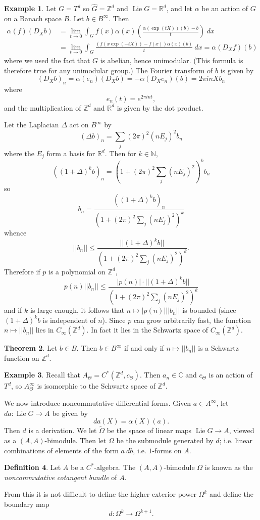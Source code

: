 \documentclass[12pt]{report}
\newcommand{\NN}{\mathbb{N}}
\newcommand{\ZZ}{\mathbb{Z}}
\newcommand{\RR}{\mathbb{R}}
\newcommand{\CC}{\mathbb{C}}
\newcommand{\Lie}{\operatorname{Lie}}
\newcommand{\dfn}[1]{\emph{#1}\index{#1}}
\theoremstyle{definition}
\newtheorem{theorem}{Theorem}[chapter]
\newtheorem{definition}[theorem]{Definition}
\newtheorem{example}[theorem]{Example}
\begin{document}
\begin{example}
    Let $G = T^d$ so $\hat G = \ZZ^d$ and $\Lie G = \RR^d$, and let $\alpha$ be an action of $G$ on a Banach space $B$. Let $b \in B^\infty$. Then
\begin{align*}
    \alpha(f)(D_Xb) &= \lim_{t \to 0} \int_G f(x) \alpha(x)\left(\frac{\alpha(\exp(tX))(b) - b}{t}\right) ~dx\\
        &= \lim_{t \to 0} \int_G \frac{(f(x \exp(-tX)) - f(x))\alpha(x)(b)}{t} ~dx = \alpha(D_Xf)(b)
\end{align*}
    where we used the fact that $G$ is abelian, hence unimodular. (This formula is therefore true for any unimodular group.) The Fourier transform of $b$ is given by
    $$(D_Xb)_n = \alpha(e_n)(D_Xb) = -\alpha(D_Xe_n)(b) = 2\pi inXb_n$$
    where
    $$e_n(t) = e^{2\pi int},$$
    and the multiplication of $\ZZ^d$ and $\RR^d$ is given by the dot product.

    Let the Laplacian $\Delta$ act on $B^\infty$ by
    $$(\Delta b)_n = \sum_j (2\pi)^2 (nE_j)^2 b_n$$
    where the $E_j$ form a basis for $\RR^d$. Then for $k \in \NN$,
    $$((1 + \Delta)^k b)_n = \left(1 + (2\pi)^2 \sum_j (nE_j)^2\right)^k b_n$$
    so
    $$b_n = \frac{((1 + \Delta)^kb)_n}{(1 + (2\pi)^2\sum_j(nE_j)^2)^k}$$
    whence
    $$||b_n|| \leq \frac{||(1+ \Delta)^kb||}{(1 + (2\pi)^2\sum_j (nE_j)^2)^k}.$$
    Therefore if $p$ is a polynomial on $\ZZ^d$,
    $$p(n)||b_n|| \leq \frac{|p(n)|\cdot ||(1 + \Delta)^kb||}{(1 + (2\pi)^2 \sum_j (nE_j)^2)^k}$$
    and if $k$ is large enough, it follows that $n \mapsto |p(n)|||b_n||$ is bounded (since $(1 + \Delta)^kb$ is independent of $n$). Since $p$ can grow arbitrarily fast, the function $n \mapsto ||b_n||$ lies in $C_\infty(\ZZ^d)$. In fact it lies in the Schwartz space of $C_\infty(\ZZ^d)$.
\end{example}
\begin{theorem}
    Let $b \in B$. Then $b \in B^\infty$ if and only if $n \mapsto ||b_n||$ is a Schwartz function on $\ZZ^d$.
\end{theorem}
\begin{example}
    Recall that $A_\Theta = C^*(\ZZ^d, c_\Theta)$. Then $a_n \in \CC$ and $c_\Theta$ is an action of $T^d$, so $A_\Theta^\infty$ is isomorphic to the Schwartz space of $\ZZ^d$.
\end{example}
    We now introduce noncommutative differential forms. Given $a \in A^\infty$, let $da: \Lie G \to A$ be given by
    $$da(X) = \alpha(X)(a).$$
    Then $d$ is a derivation. We let $\tilde \Omega$ be the space of linear maps $\Lie G \to A$, viewed as a $(A, A)$-bimodule. Then let $\Omega$ be the submodule generated by $d$; i.e. linear combinations of elements of the form $a~db$, i.e. $1$-forms on $A$.
\begin{definition}
    Let $A$ be a $C^*$-algebra. The $(A,A)$-bimodule $\Omega$ is known as the \dfn{noncommutative cotangent bundle} of $A$.
\end{definition}
    From this it is not difficult to define the higher exterior power $\Omega^k$ and define the boundary map
    $$d: \Omega^k \to \Omega^{k+1}.$$
\end{document}
